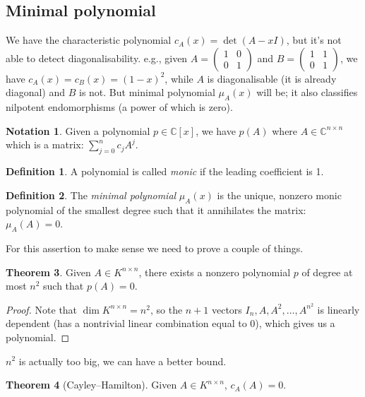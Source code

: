 \documentclass[a4paper]{article}
\theoremstyle{definition}
\newtheorem{defn}{Definition}[subsection]
\newtheorem{thm}[defn]{Theorem}
\newtheorem*{notation}{Notation}
\begin{document}
\subsection{Minimal polynomial}
We have the characteristic polynomial $c_{A}(x)=\det (A-xI)$, but it's not able to detect diagonalisability. e.g., given $A = \begin{pmatrix}
	1 & 0 \\ 0 & 1
\end{pmatrix}$ and $B = \begin{pmatrix}
	1 & 1 \\ 0 & 1
\end{pmatrix}$, we have $c_{A}(x)=c_{B}(x)=(1-x)^2$, while $A$ is diagonalisable (it is already diagonal) and $B$ is not. But minimal polynomial $\mu_{A}(x)$ will be; it also classifies nilpotent endomorphisms (a power of which is zero).

\begin{notation}
	Given a polynomial $p \in \mathbb C [x]$, we have $p(A)$ where $A \in \mathbb C^{n \times n}$ which is a matrix: $\displaystyle \sum_{j=0}^n c_j A^j$.
\end{notation}

\begin{defn}
	A polynomial is called \textit{monic} if the leading coefficient is 1.
\end{defn}

\begin{defn}
The \textit{minimal polynomial} $\mu_{A}(x)$ is the unique, nonzero monic polynomial of the smallest degree such that it annihilates the matrix: $\mu_{A}(A)=0$.
\end{defn}

For this assertion to make sense we need to prove a couple of things.

\begin{thm}
	Given $A \in K^{n\times n}$, there exists a nonzero polynomial $p$ of degree at most $n^2$ such that $p(A)=0$.
\end{thm}

\begin{proof}
	Note that $\dim K^{n\times n}=n^2$, so the $n+1$ vectors $I_n, A, A^2, \ldots , A^{n^2}$ is linearly dependent (has a nontrivial linear combination equal to 0), which gives us a polynomial.
\end{proof}

$n^2$ is actually too big, we can have a better bound.

\begin{thm} [Cayley--Hamilton]
	Given $A \in K^{n\times n}$, $c_{A}(A)=0$.
\end{thm}
\end{document}
